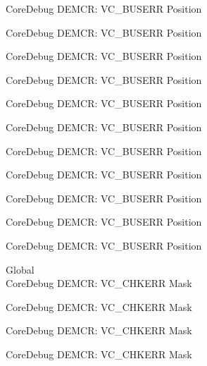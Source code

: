\begin{DoxyRefList}
\label{deprecated__deprecated000203}%
%
Core\+Debug DEMCR\+: VC\+\_\+\+BUSERR Position 

\label{deprecated__deprecated000345}%
%
Core\+Debug DEMCR\+: VC\+\_\+\+BUSERR Position 

\label{deprecated__deprecated000421}%
%
Core\+Debug DEMCR\+: VC\+\_\+\+BUSERR Position 

\label{deprecated__deprecated000510}%
%
Core\+Debug DEMCR\+: VC\+\_\+\+BUSERR Position 

\label{deprecated__deprecated000612}%
%
Core\+Debug DEMCR\+: VC\+\_\+\+BUSERR Position 

\label{deprecated__deprecated000737}%
%
Core\+Debug DEMCR\+: VC\+\_\+\+BUSERR Position 

\label{deprecated__deprecated000881}%
%
Core\+Debug DEMCR\+: VC\+\_\+\+BUSERR Position 

\label{deprecated__deprecated001023}%
%
Core\+Debug DEMCR\+: VC\+\_\+\+BUSERR Position 

\label{deprecated__deprecated001099}%
%
Core\+Debug DEMCR\+: VC\+\_\+\+BUSERR Position 

\label{deprecated__deprecated001188}%
%
Core\+Debug DEMCR\+: VC\+\_\+\+BUSERR Position 

\label{deprecated__deprecated001290}%
%
Core\+Debug DEMCR\+: VC\+\_\+\+BUSERR Position  
\item[Global \doxylink{group___c_m_s_i_s___core_debug_ga2f98b461d19746ab2febfddebb73da6f}{Core\+Debug\+\_\+\+DEMCR\+\_\+\+VC\+\_\+\+CHKERR\+\_\+\+Msk} ]\hfill \\
\label{deprecated__deprecated000064}%
%
Core\+Debug DEMCR\+: VC\+\_\+\+CHKERR Mask 

\label{deprecated__deprecated000208}%
%
Core\+Debug DEMCR\+: VC\+\_\+\+CHKERR Mask 

\label{deprecated__deprecated000350}%
%
Core\+Debug DEMCR\+: VC\+\_\+\+CHKERR Mask 

\label{deprecated__deprecated000426}%
%
Core\+Debug DEMCR\+: VC\+\_\+\+CHKERR Mask 


\end{DoxyRefList}
